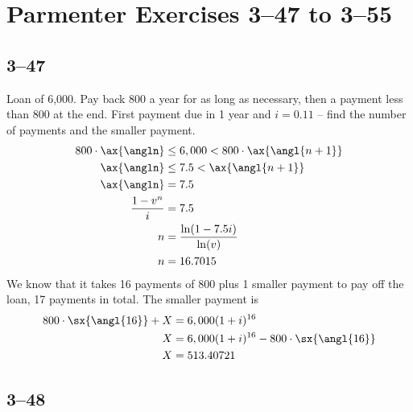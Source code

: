 \documentclass[a4paper, 12pt, reqno]{amsart}
\title{\titl}
\author{Moritz M. Konarski}
\date{\today}
\numberwithin{equation}{section}
\begin{document}
\maketitle

\section*{Parmenter Exercises 3--47 to 3--55}

\subsection*{3--47}

Loan of 6,000. Pay back 800 a year for as long as necessary, then a payment
less than 800 at the end. First payment due in 1 year and $i=0.11$ -- find the
number of payments and the smaller payment.
\begin{equation}\nonumber
    \begin{aligned}
        800 \cdot \ax{\angln} &\le 6,000 < 800 \cdot \ax{\angl{n+1}}    \\
        \ax{\angln} &\le 7.5 < \ax{\angl{n+1}}                          \\
        \ax{\angln} &= 7.5                                              \\
        \frac{1-v^n}{i} &= 7.5       \\
        n &= \frac{\ln(1-7.5i)}{\ln(v)} \\
        n &= 16.7015
    \end{aligned}
\end{equation}
We know that it takes 16 payments of 800 plus 1 smaller payment to pay off the
loan, 17 payments in total. The smaller payment is
\begin{equation}\nonumber
    \begin{aligned}
        800 \cdot \sx{\angl{16}} + X &= 6,000(1+i)^{16}     \\
        X &= 6,000(1+i)^{16} - 800 \cdot \sx{\angl{16}}         \\
        X &= 513.40721          \\
    \end{aligned}
\end{equation}

\subsection*{3--48}
\end{document}
